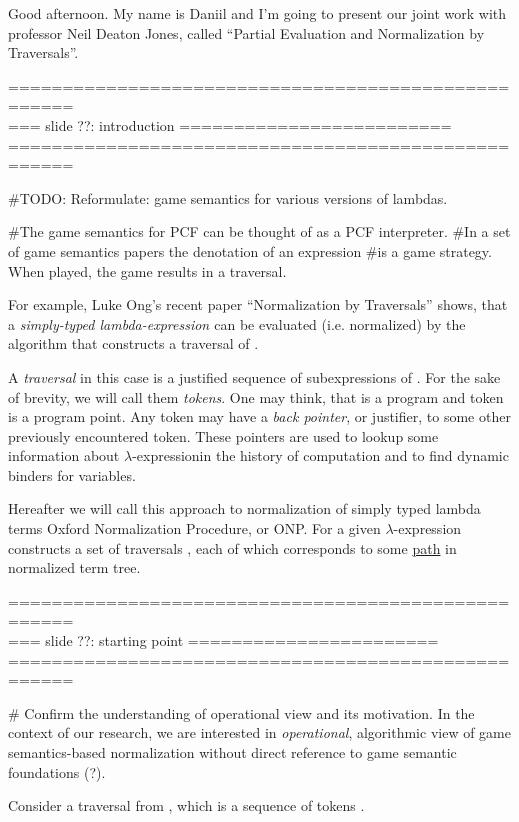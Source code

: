 \documentclass[a4paper, 10pt]{article} %
\newcommand{\red}[1]{{\color{red}#1}}
\newcommand{\green}[1]{{\color{blue!20!black!30!green}#1}}
\newcommand{\blue}[1]{{\color{blue}#1}}
\newcommand{\lam}[1]{{\color{brown}\emph{\boldmath{#1}}}}
\newcommand{\lexp}{$\lambda$-expression}
\begin{document}
Good afternoon. My name is Daniil and I'm going to present our joint work with 
professor Neil Deaton Jones, called ``Partial Evaluation and Normalization by 
Traversals''. 


====================================================\\
=== slide ??: introduction =========================\\
====================================================


\#TODO:
Reformulate: game semantics for various versions of lambdas.

\#The game semantics for PCF can be thought of as a PCF interpreter.
\#In a set of game semantics papers the denotation of an expression
\#is a game strategy. When played, the game results in a traversal.

For example, Luke Ong’s recent paper ``Normalization by Traversals''
shows, that a \blue{\emph{simply-typed lambda-expression \lam{M}}}
can be \red{evaluated} (i.e. normalized) by the algorithm that
constructs a \green{traversal} of \lam{M}.

A \green{\emph{traversal}} in this case is a justified sequence
of subexpressions of \lam{M}. For the sake of brevity, we will call them
\green{\emph{tokens}}. One may think, that \lam{$M$} is 
a \blue{program} and token is a \blue{program point}. Any token
may have a \green{\emph{back pointer}}, or justifier, to some other 
previously encountered token. These pointers are used to lookup some 
information about \lexp in the history of computation and to find
dynamic binders for variables.

Hereafter we will call this approach to normalization of simply typed
lambda terms Oxford Normalization Procedure, or ONP. For a given \lexp
\lam{$M$} \lam{ONP} constructs a set of traversals
\lam{$\mathfrak{Trav}(M)$}, each of which corresponds to some
\underline{path} in normalized term tree.


====================================================\\
=== slide ??: starting point =======================\\
====================================================

\# Confirm the understanding of operational view and its motivation.
In the context of our research, we are interested in \emph{operational}, 
algorithmic view of game semantics-based normalization without direct
reference to game semantic foundations (?).

Consider a traversal \lam{$tr$} from \lam{$\mathfrak{Trav}(M)$}, which is
a sequence of tokens \lam{$t_0$} \lam{$t_n$}.
\end{document}
